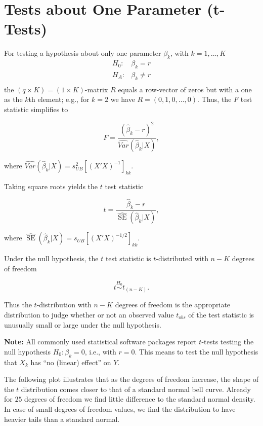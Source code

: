 \documentclass[
  letterpaper,
  DIV=11,
  numbers=noendperiod]{scrreprt}
\theoremstyle{definition}
\theoremstyle{plain}
\theoremstyle{plain}
\theoremstyle{remark}
\begin{document}
\hypertarget{ch:testingsinglep}{%
\section{Tests about One Parameter (t-Tests)}\label{ch:testingsinglep}}

For testing a hypothesis about only one parameter \(\beta_k\), with
\(k=1,\dots,K\) \begin{equation*}
\begin{array}{ll}
H_0: & \beta_k=r\\
H_A: & \beta_k\ne r\\
\end{array}
\end{equation*} the \((q\times K)=(1\times K)\)-matrix \(R\) equals a
row-vector of zeros but with a one as the \(k\)th element; e.g., for
\(k=2\) we have \(R=(0,1,0,\dots,0).\) Thus, the \(F\) test statistic
simplifies to

\[
F=\frac{\left(\hat{\beta}_k-r\right)^2}{\widehat{Var}(\hat{\beta}_k|X)},
\]

where \(\widehat{Var}(\hat{\beta}_k|X)=s^2_{UB}[(X'X)^{-1}]_{kk}.\)

Taking square roots yields the \(t\) test statistic

\[
t=\frac{\hat{\beta}_k-r}{\widehat{\operatorname{SE}}(\hat{\beta}_k|X)},
\]

where
\(\widehat{\operatorname{SE}}(\hat{\beta}_k|X)=s_{UB}[(X'X)^{-1/2}]_{kk}.\)

Under the null hypothesis, the \(t\) test statistic is \(t\)-distributed
with \(n-K\) degrees of freedom

\[
t\overset{H_0}{\sim}t_{(n-K)}.
\]

Thus the \(t\)-distribution with \(n-K\) degrees of freedom is the
appropriate distribution to judge whether or not an observed value
\(t_{obs}\) of the test statistic is unusually small or large under the
null hypothesis.

\textbf{Note:} All commonly used statistical software packages report
\(t\)-tests testing the null hypothesis \(H_0:\beta_k=0\), i.e., with
\(r=0\). This means to test the null hypothesis that \(X_k\) has ``no
(linear) effect'' on \(Y\).

The following plot illustrates that as the degrees of freedom increase,
the shape of the \(t\) distribution comes closer to that of a standard
normal bell curve. Already for \(25\) degrees of freedom we find little
difference to the standard normal density. In case of small degrees of
freedom values, we find the distribution to have heavier tails than a
standard normal.
\end{document}
